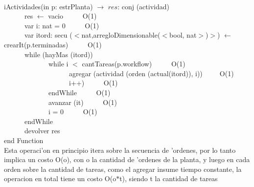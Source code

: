 \documentclass[a4paper,10pt]{article}
\begin{document}
\begin{algoritmo}
\caption{}\\
  iActividades(in p: estrPlanta) $\rightarrow$ $res$: conj (actividad) \\
	\indent \ \ \ \ \ \  res $\gets$ vacio  \ \ \ \ \ O(1)\\
	\indent \ \ \ \ \ \  var i: nat = 0  \ \ \ \ \ O(1)\\
	\indent \ \ \ \ \ \  var itord: secu ($<$nat,arregloDimensionable($<$bool, nat$>$)$>$) $\gets$ crearIt(p.terminadas)  \ \ \ \ \ O(1)\\
	\indent \ \ \ \ \ \  while (hayMas (itord))  \ \ \ \ \ \\
	\indent \ \ \ \ \ \ \ \ \ \ \ \ \ while i $<$ cantTareas(p.workflow) \ \ \ \ \ O(1) \\
	\indent \ \ \ \ \ \ \ \ \ \ \ \ \ \ \ \ \ \ \ agregar (actividad (orden (actual(itord)), i))\ \ \ \ \ O(1) \\
	\indent \ \ \ \ \ \ \ \ \ \ \ \ \ \ \ \ \ \ \ i++) \ \ \ \ \ O(1) \\
	\indent \ \ \ \ \ \ \ \ \ \ \ \ \ endWhile \ \ \ \ \ O(1)\\
	\indent \ \ \ \ \ \ \ \ \ \ \ \ \ avanzar (it) \ \ \ \ \ O(1)\\
	\indent \ \ \ \ \ \ \ \ \ \ \ \ \ i = 0 \ \ \ \ \ O(1)\\
	\indent \ \ \ \ \ \ endWhile \ \ \ \ \ \\
   	\indent \ \ \ \ \ \ devolver res    \\
   end Function \\

Esta operaci'on en principio itera sobre la secuencia de 'ordenes, por lo tanto implica un costo O(o), con o la cantidad de 'ordenes de la planta, y luego en cada orden sobre la cantidad de tareas, como el agregar insume tiempo constante, la operacion en total tiene un costo O(o$*$t), siendo t la cantidad de tareas
\end{algoritmo}
\end{document}
